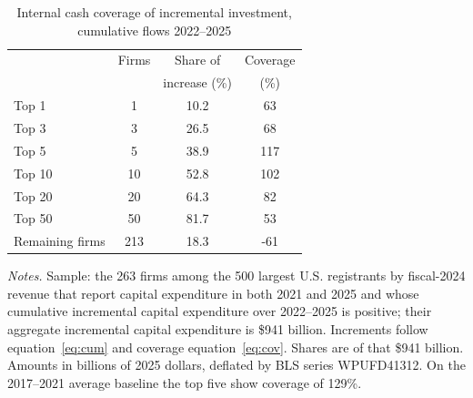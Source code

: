 \documentclass[preprint,11pt]{elsarticle}
\begin{document}
\begin{table}[htbp]
\centering
\caption{Internal cash coverage of incremental investment, cumulative flows 2022--2025}
\label{tab:ladder}
\small
\begin{tabular}{l S[table-format=3.0] S[table-format=2.1] S[table-format=-3.0]}
\toprule
& {Firms} & {Share of} & {Coverage} \\
& & {increase (\%)} & {(\%)} \\
\midrule
\quad Top 1              & 1   & 10.2 & 63   \\
\quad Top 3              & 3   & 26.5 & 68   \\
\quad Top 5              & 5   & 38.9 & 117  \\
\quad Top 10             & 10  & 52.8 & 102  \\
\quad Top 20             & 20  & 64.3 & 82   \\
\quad Top 50             & 50  & 81.7 & 53   \\
\quad Remaining firms    & 213 & 18.3 & -61  \\
\bottomrule
\end{tabular}
\par\vspace{5pt}
\begin{minipage}{0.96\linewidth}\footnotesize
\textit{Notes.} Sample: the 263 firms among the 500 largest U.S. registrants by fiscal-2024 revenue
that report capital expenditure in both 2021 and 2025 and whose cumulative incremental capital
expenditure over 2022--2025 is positive; their aggregate incremental capital expenditure is \$941
billion. Increments follow equation~\eqref{eq:cum} and coverage equation~\eqref{eq:cov}. Shares are
of that \$941 billion. Amounts in billions of 2025 dollars, deflated by BLS series WPUFD41312. On
the 2017--2021 average baseline the top five show coverage of 129\%.
\end{minipage}
\end{table}
\end{document}
